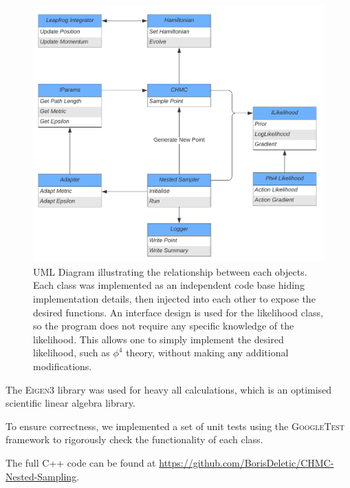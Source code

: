 \documentclass[11pt]{article}
\begin{document}
    \begin{figure}[t!]
        \center
        \includegraphics[width=\linewidth]{../figures/UML_Diagram}
        \caption{
            UML Diagram illustrating the relationship between each objects.
            Each class was implemented as an independent code base hiding implementation details, then injected into
            each other to expose the desired functions.
            An interface design is used for the likelihood class, so the program does not require any specific knowledge
            of the likelihood.
            This allows one to simply implement the desired likelihood, such as $\phi^4$ theory, without making any
            additional modifications.
        }\label{fig:uml_diagram}
    \end{figure}

    The \textsc{Eigen3} library was used for heavy all calculations, which is an optimised scientific
    linear algebra library.

    To ensure correctness, we implemented a set of unit tests using the \textsc{GoogleTest} framework to rigorously
    check the functionality of each class.

    The full C++ code can be found at \url{https://github.com/BorisDeletic/CHMC-Nested-Sampling}.
\end{document}
